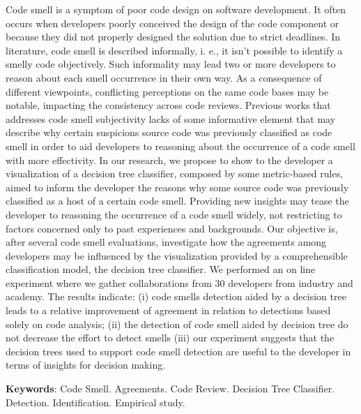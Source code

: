 \begin{resumo}

Code smell is a symptom of poor code design on software development. It often occurs when developers poorly conceived the design of the code component or because they did not properly designed the solution due to strict deadlines. In literature, code smell is described informally, i. e., it isn't possible to identify a smelly code objectively. Such informality may lead two or more developers to reason about each smell occurrence in their own way. As a consequence of different viewpoints, conflicting perceptions on the same code bases may be notable, impacting the consistency across code reviews. Previous works that addresses code smell subjectivity lacks of some informative element that may describe why certain suspicions source code was previously classified as code smell in order to aid developers to reasoning about the occurrence of a code smell with more effectivity. In our research, we propose to show to the developer a visualization of a decision tree classifier, composed by some metric-based rules, aimed to inform the developer the reasons why some source code was previously classified as a host of a certain code smell. Providing new insights may tease the developer to reasoning the occurrence of a code smell widely, not restricting to factors concerned only to past experiences and backgrounds. Our objective is, after several code smell evaluations, investigate how the agreements among developers may be influenced by the visualization provided by a comprehensible classification model, the decision tree classifier. We performed an on line experiment where we gather collaborations from 30  developers from industry and academy. The results indicate: (i) code smells detection aided by a decision tree leads to a relative improvement of agreement in relation to detections based solely on code analysis; (ii) the detection of code smell aided by decision tree do not decrease the effort to detect smells (iii) our experiment suggests that the decision trees used to support code smell detection are useful to the developer in terms of insights for decision making.
 
\textbf{Keywords}: Code Smell. Agreements. Code Review. Decision Tree Classifier. Detection. Identification. Empirical study.

\end{resumo}